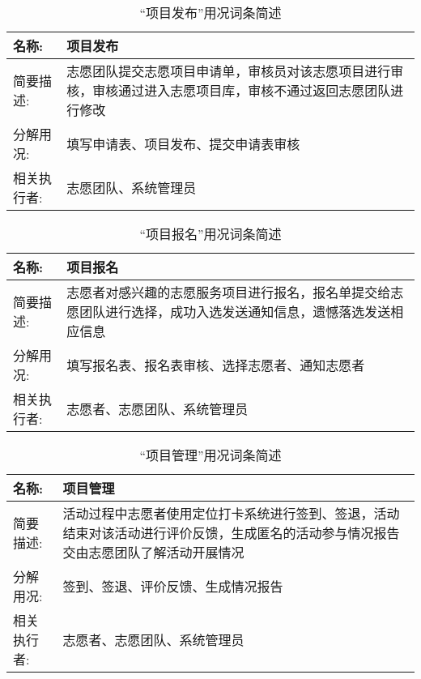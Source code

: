 \begin{table}[H]  
\caption{“项目发布”用况词条简述}  
\begin{center}  
    \begin{tabular}{l p{11cm}} 
        \hline
        \quad 名称:  & 项目发布 \\
        \hline
        \quad 简要描述:  & 志愿团队提交志愿项目申请单，审核员对该志愿项目进行审核，审核通过进入志愿项目库，审核不通过返回志愿团队进行修改 \\
        \hline
        \quad 分解用况:  & 填写申请表、项目发布、提交申请表审核 \\
        \hline
        \quad 相关执行者:  & 志愿团队、系统管理员 \\
        \hline
    \end{tabular}
    \label{tab1}
\end{center}
\end{table}

\begin{table}[H]  
\caption{“项目报名”用况词条简述}  
\begin{center}  
    \begin{tabular}{l p{11cm}} 
        \hline
        \quad 名称:  & 项目报名 \\
        \hline
        \quad 简要描述:  & 志愿者对感兴趣的志愿服务项目进行报名，报名单提交给志愿团队进行选择，成功入选发送通知信息，遗憾落选发送相应信息 \\
        \hline
        \quad 分解用况:  & 填写报名表、报名表审核、选择志愿者、通知志愿者 \\
        \hline
        \quad 相关执行者:  & 志愿者、志愿团队、系统管理员 \\
        \hline
    \end{tabular}
    \label{tab1}
\end{center}
\end{table}

\begin{table}[H]  
\caption{“项目管理”用况词条简述}  
\begin{center}  
    \begin{tabular}{l p{11cm}} 
        \hline
        \quad 名称:  & 项目管理 \\
        \hline
        \quad 简要描述:  & 活动过程中志愿者使用定位打卡系统进行签到、签退，活动结束对该活动进行评价反馈，生成匿名的活动参与情况报告交由志愿团队了解活动开展情况 \\
        \hline
        \quad 分解用况:  & 签到、签退、评价反馈、生成情况报告 \\
        \hline
        \quad 相关执行者:  & 志愿者、志愿团队、系统管理员 \\
        \hline
    \end{tabular}
    \label{tab1}
\end{center}
\end{table}
